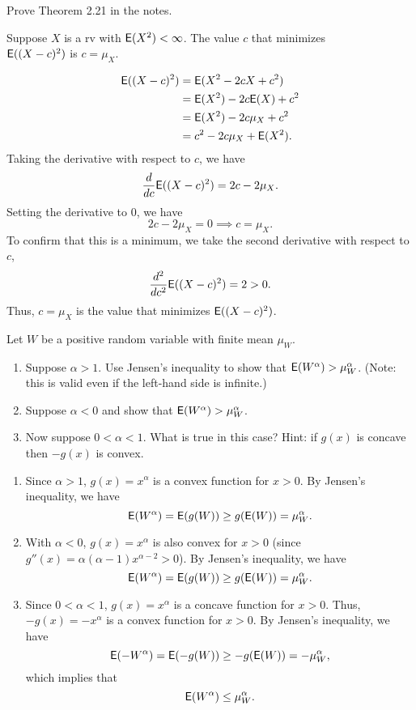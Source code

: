 \documentclass[12pt]{article}
\newcommand{\E}{{\sf E}}
\newenvironment{theorem}[2][Theorem]{\begin{trivlist}
\item[\hskip \labelsep {\bfseries #1}\hskip \labelsep {\bfseries #2.}]}
{\end{trivlist}}
\newenvironment{problem}[2][Problem]{\begin{trivlist}
\item[\hskip \labelsep {\bfseries #1}\hskip \labelsep {\bfseries #2.}]}
{\end{trivlist}}
\begin{document}
\begin{problem}{6} Prove Theorem 2.21 in the notes.
  \begin{theorem}{2.21}
    Suppose $X$ is a rv with $\E(X^2) < \infty$. The value $c$ that minimizes\\
    $\E((X - c)^2)$ is $c = \mu_X$.
  \end{theorem}
  \[
    \begin{aligned}
      \E((X - c)^2) &= \E(X^2 - 2cX + c^2) \\
      &= \E(X^2) - 2c\E(X) + c^2 \\
      &= \E(X^2) - 2c\mu_X + c^2 \\
      &= c^2 - 2c\mu_X + \E(X^2).
    \end{aligned}
  \]
  Taking the derivative with respect to $c$, we have
  \[
    \frac{d}{dc} \E((X - c)^2) = 2c - 2\mu_X.
  \]
  Setting the derivative to 0, we have 
  \[
    2c - 2\mu_X = 0 \implies c = \mu_X.
  \]
  To confirm that this is a minimum, we take the second derivative 
  with respect to $c$,
  \[
    \frac{d^2}{dc^2} \E((X - c)^2) = 2 > 0.
  \]
  Thus, $c = \mu_X$ is the value that minimizes $\E((X - c)^2)$.
\end{problem}

\begin{problem}{7} 
  Let $W$ be a positive random variable with finite mean $\mu_W$.
  \begin{enumerate}
    \item Suppose $\alpha > 1$. Use Jensen's inequality to 
    show that $\E(W^\alpha) > \mu_W^\alpha$. (Note: this is valid
    even if the left-hand side is infinite.)
    \item Suppose $\alpha < 0$ and show that $\E(W^\alpha) > \mu_W^\alpha$.
    \item Now suppose $0 < \alpha < 1$. What is true in this case? 
    Hint: if $g(x)$ is concave then $-g(x)$ is convex.
  \end{enumerate}
  \begin{enumerate}
    \item Since $\alpha > 1$, $g(x) = x^\alpha$ is a convex function for $x > 0$.
    By Jensen's inequality, we have
    \[
      \E(W^\alpha) = \E(g(W)) \ge g(\E(W)) = \mu_W^\alpha.
    \]
    \item With $\alpha < 0$, $g(x) = x^\alpha$ is also convex for $x > 0$ (since
    $g''(x) = \alpha(\alpha-1)x^{\alpha-2} > 0$). By Jensen's inequality, we have
    \[
      \E(W^\alpha) = \E(g(W)) \ge g(\E(W)) = \mu_W^\alpha.
    \]
    \item Since $0 < \alpha < 1$, $g(x) = x^\alpha$ is a 
    concave function for $x > 0$.
    Thus, $-g(x) = -x^\alpha$ is a convex function for $x > 0$.
    By Jensen's inequality, we have
    \[
      \E(-W^\alpha) = \E(-g(W)) \ge -g(\E(W)) = -\mu_W^\alpha,
    \]
    which implies that
    \[
      \E(W^\alpha) \le \mu_W^\alpha.
    \]
  \end{enumerate}
\end{problem}
\end{document}
